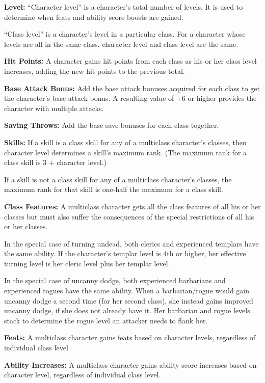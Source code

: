 \textbf{Level:} ``Character level'' is a character's total number of levels. It is used to determine when feats and ability score boosts are gained.

``Class level'' is a character's level in a particular class. For a character whose levels are all in the same class, character level and class level are the same.

\textbf{Hit Points:} A character gains hit points from each class as his or her class level increases, adding the new hit points to the previous total.

\textbf{Base Attack Bonus:} Add the base attack bonuses acquired for each class to get the character's base attack bonus. A resulting value of +6 or higher provides the character with multiple attacks.

\textbf{Saving Throws:} Add the base save bonuses for each class together.

\textbf{Skills:} If a skill is a class skill for any of a multiclass character's classes, then character level determines a skill's maximum rank. (The maximum rank for a class skill is 3 + character level.)

If a skill is not a class skill for any of a multiclass character's classes, the maximum rank for that skill is one-half the maximum for a class skill.

\textbf{Class Features:} A multiclass character gets all the class features of all his or her classes but must also suffer the consequences of the special restrictions of all his or her classes.

In the special case of turning undead, both clerics and experienced templars have the same ability. If the character's templar level is 4th or higher, her effective turning level is her cleric level plus her templar level.

In the special case of uncanny dodge, both experienced barbarians and experienced rogues have the same ability. When a barbarian/rogue would gain uncanny dodge a second time (for her second class), she instead gains improved uncanny dodge, if she does not already have it. Her barbarian and rogue levels stack to determine the rogue level an attacker needs to flank her.

\textbf{Feats:} A multiclass character gains feats based on character levels, regardless of individual class level

\textbf{Ability Increases:} A multiclass character gains ability score increases based on character level, regardless of individual class level.

